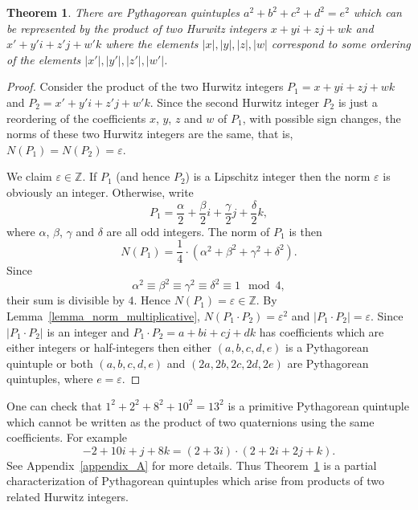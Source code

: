 \documentclass[12pt,table]{article}
\newtheorem{theorem}{Theorem}[section]
\theoremstyle{definition}
\theoremstyle{remark}
\newcommand{\Zzz}{\mathbb Z}
\numberwithin{equation}{section}
\begin{document}
\begin{theorem}
\label{theorem_as_products}
There are Pythagorean quintuples 
$a^2 + b^2 +c^2 +d^2 = e^2$ which can be represented
by the product of two Hurwitz integers
$x + yi + zj + wk$ and
$x' + y'i + z'j + w'k$
where
the elements
$|x|, |y|, |z|, |w|$ correspond
to some ordering of the elements
$|x'|, |y'|, |z'|, |w'|$.
\end{theorem}
\begin{proof}
Consider the product of the two Hurwitz integers
$P_1 = x + yi + zj + wk$ and
$P_2 = x' + y'i + z'j + w'k$.  
Since the second Hurwitz integer $P_2$ 
is just a reordering of
the coefficients $x$, $y$, $z$ and $w$ of $P_1$, 
with possible sign changes,
the norms  of these two Hurwitz integers
are the same, that is,
$N(P_1) = N(P_2) = \varepsilon$.


We claim $\varepsilon \in \Zzz$.  If $P_1$ (and hence $P_2$)
is a Lipschitz integer then 
the norm $\varepsilon$ is obviously an integer.
Otherwise, write 
$$
  P_1 = \frac{\alpha}{2} + \frac{\beta}{2} i + 
        \frac{\gamma}{2} j + \frac{\delta}{2} k,
$$
where
$\alpha$, $\beta$, $\gamma$ and $\delta$ are all odd integers.
The norm of $P_1$ is then
$$
     N(P_1) = \frac{1}{4} \cdot 
              (\alpha^2 + \beta^2 + \gamma^2 + \delta^2).
$$
Since
$$
  \alpha^2 \equiv \beta^2 \equiv \gamma^2 \equiv \delta^2 \equiv 1 \mod 4,
$$
their sum is divisible by $4$.
Hence $N(P_1) = \varepsilon \in \Zzz$.
By Lemma~\ref{lemma_norm_multiplicative},
$N(P_1 \cdot P_2) = \varepsilon^2$
and 
$|P_1 \cdot P_2| = \varepsilon$.
Since $|P_1 \cdot P_2|$ is an integer and 
$P_1 \cdot P_2 = a + bi + cj + dk$ has
coefficients which are either integers or half-integers 
then
either
$(a,b,c,d,e)$ is a Pythagorean quintuple
or
both
$(a,b,c,d,e)$ and
$(2a,2b,2c,2d,2e)$ are Pythagorean quintuples,
where
$e = \varepsilon$.
\end{proof}





One can check that 
$1^2+ 2^2+ 8^2+ 10^2  = 13^2$
is a primitive Pythagorean quintuple which
cannot be written as the product of two quaternions
using the same coefficients.
For example
$$
  -2 + 10 i + j + 8k = (2 + 3i) \cdot (2 + 2i + 2j + k).
$$
See Appendix~\ref{appendix_A} for more details.
Thus Theorem~\ref{theorem_as_products} 
is a partial characterization of Pythagorean quintuples 
which arise from products of two related Hurwitz integers.
\end{document}
